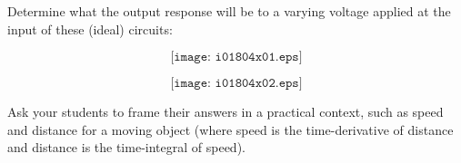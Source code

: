 

Determine what the output response will be to a varying voltage applied at the input of these (ideal) circuits:

$$\texttt{[image: i01804x01.eps]}$$







$$\texttt{[image: i01804x02.eps]}$$







Ask your students to frame their answers in a practical context, such as speed and distance for a moving object (where speed is the time-derivative of distance and distance is the time-integral of speed).




